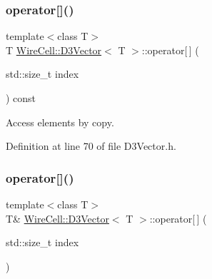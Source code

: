 \mbox{\label{class_wire_cell_1_1_d3_vector_ac5cfef3dd3a6886c86ad58f020bb2ab4}} 
\subsubsection{\texorpdfstring{operator[]()}{operator[]()}\hspace{0.1cm}{\footnotesize\ttfamily [1/2]}}
{\footnotesize\ttfamily template$<$class T$>$ \\
T \hyperlink{class_wire_cell_1_1_d3_vector}{Wire\+Cell\+::\+D3\+Vector}$<$ T $>$\+::operator\mbox{[}$\,$\mbox{]} (\begin{DoxyParamCaption}\item[{std\+::size\+\_\+t}]{index }\end{DoxyParamCaption}) const\hspace{0.3cm}{\ttfamily [inline]}}



Access elements by copy. 



Definition at line 70 of file D3\+Vector.\+h.

\mbox{\label{class_wire_cell_1_1_d3_vector_a7e5f8ace33d45da46becde8152e652ac}} 
\subsubsection{\texorpdfstring{operator[]()}{operator[]()}\hspace{0.1cm}{\footnotesize\ttfamily [2/2]}}
{\footnotesize\ttfamily template$<$class T$>$ \\
T\& \hyperlink{class_wire_cell_1_1_d3_vector}{Wire\+Cell\+::\+D3\+Vector}$<$ T $>$\+::operator\mbox{[}$\,$\mbox{]} (\begin{DoxyParamCaption}\item[{std\+::size\+\_\+t}]{index }\end{DoxyParamCaption})\hspace{0.3cm}{\ttfamily [inline]}}



